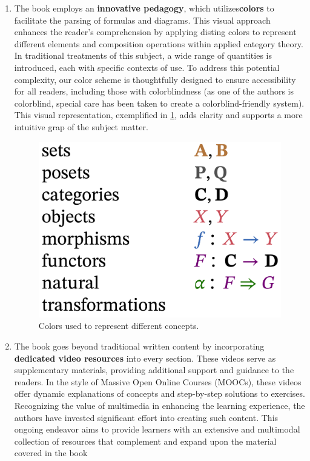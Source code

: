 \documentclass[10pt, article, one side]{memoir}
\begin{document}
\begin{enumerate}
        \item   The book employs an \textbf{innovative pedagogy}, which utilizes\textbf{colors} to facilitate the parsing of formulas and diagrams.
              This visual approach enhances the reader's comprehension by applying disting colors to represent different elements and composition operations within applied category theory.
              In traditional treatments of this subject, a wide range of quantities is introduced, each with specific contexts of use.
              To address this potential complexity, our color scheme is thoughtfully designed to ensure accessibility for all readers, including those with colorblindness (as one of the authors is colorblind, special care has been taken to create a colorblind-friendly system).
              This visual representation, exemplified in \cref{fig:use-colors}, adds clarity and supports a more intuitive grap of the subject matter.

              \begin{figure}[h]
                  \begin{center}
                      \includegraphics[width=0.3\linewidth]{pics/use_colors}
                  \end{center}
                  \caption{Colors used to represent different concepts. \label{fig:use-colors}}
              \end{figure}
        \item The book goes beyond traditional written content by incorporating \textbf{dedicated video resources} into every section.
              These videos serve as supplementary materials, providing additional support and guidance to the readers.
              In the style of Massive Open Online Courses (MOOCs), these videos offer dynamic explanations of concepts and step-by-step solutions to exercises.
              Recognizing the value of multimedia in enhancing the learning experience, the authors have invested significant effort into creating such content.
              This ongoing endeavor aims to provide learners with an extensive and multimodal collection of resources that complement and expand upon the material covered in the book
    \end{enumerate}
\end{document}
